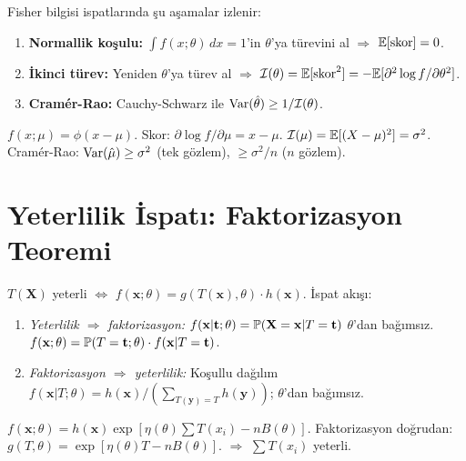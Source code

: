 Fisher bilgisi ispatlarında şu aşamalar izlenir:

\begin{enumerate}
  \item \textbf{Normallik koşulu:} $\int f(x;\theta)\,dx=1$'in $\theta$'ya türevini al $\Rightarrow$ $\mathbb{E}[\text{skor}]=0$.
  \item \textbf{İkinci türev:} Yeniden $\theta$'ya türev al $\Rightarrow$ $\mathcal{I}(\theta)=\mathbb{E}[\text{skor}^2]=-\mathbb{E}[\partial^2\log f/\partial\theta^2]$.
  \item \textbf{Cramér-Rao:} Cauchy-Schwarz ile $\operatorname{Var}(\hat\theta)\geq 1/\mathcal{I}(\theta)$.
\end{enumerate}

\begin{ornek}
$f(x;\mu)=\phi(x-\mu)$. Skor: $\partial\log f/\partial\mu = x-\mu$. $\mathcal{I}(\mu)=\mathbb{E}[(X-\mu)^2]=\sigma^2$. Cramér-Rao: $\operatorname{Var}(\hat\mu)\geq\sigma^2$ (tek gözlem), $\geq\sigma^2/n$ ($n$ gözlem).
\end{ornek}

\section{Yeterlilik İspatı: Faktorizasyon Teoremi}
\label{app:faktoriz_teknik}

$T(\mathbf{X})$ yeterli $\iff$ $f(\mathbf{x};\theta)=g(T(\mathbf{x}),\theta)\cdot h(\mathbf{x})$. İspat akışı:

\begin{enumerate}
  \item \emph{Yeterlilik $\Rightarrow$ faktorizasyon:} $f(\mathbf{x}|\mathbf{t};\theta)=\mathbb{P}(\mathbf{X}=\mathbf{x}|T=\mathbf{t})$ $\theta$'dan bağımsız. $f(\mathbf{x};\theta)=\mathbb{P}(T=\mathbf{t};\theta)\cdot f(\mathbf{x}|T=\mathbf{t})$.
  \item \emph{Faktorizasyon $\Rightarrow$ yeterlilik:} Koşullu dağılım $f(\mathbf{x}|T;\theta)=h(\mathbf{x})/(\sum_{T(\mathbf{y})=T}h(\mathbf{y}))$; $\theta$'dan bağımsız.
\end{enumerate}

\begin{ornek}
$f(\mathbf{x};\theta)=h(\mathbf{x})\exp[\eta(\theta)\sum T(x_i)-nB(\theta)]$. Faktorizasyon doğrudan: $g(T,\theta)=\exp[\eta(\theta)T-nB(\theta)]$. $\Rightarrow$ $\sum T(x_i)$ yeterli.
\end{ornek}

